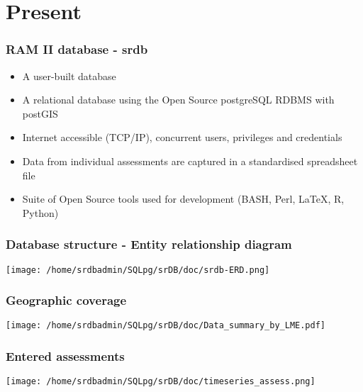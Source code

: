 \section{Present}
\begin{frame}
\frametitle{RAM II database - srdb}
\begin{itemize}
 \item A user-built database
 \item A relational database using the Open Source postgreSQL RDBMS with postGIS
 \item Internet accessible (TCP/IP), concurrent users, privileges and credentials
 \item Data from individual assessments are captured in a standardised spreadsheet file
 \item Suite of Open Source tools used for development (BASH, Perl, LaTeX, R, Python)

\end{itemize}

\end{frame}


\begin{frame}[plain]
\frametitle{Database structure - Entity relationship diagram}
\hspace*{-.6cm} \texttt{[image: /home/srdbadmin/SQLpg/srDB/doc/srdb-ERD.png]}
\end{frame}


\begin{frame}[plain]
\frametitle{Geographic coverage}
\begin{center}
\texttt{[image: /home/srdbadmin/SQLpg/srDB/doc/Data\_summary\_by\_LME.pdf]}
\end{center}
\end{frame}

\begin{frame}[plain]
\frametitle{Entered assessments}
\begin{center}
\texttt{[image: /home/srdbadmin/SQLpg/srDB/doc/timeseries\_assess.png]}
\end{center}
\end{frame}

